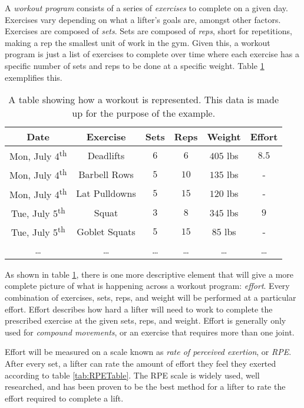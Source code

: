 A \textit{workout program} consists of a series of \textit{exercises} to complete on a given day. Exercises vary depending on what a lifter's goals are, amongst other factors. Exercises are composed of \textit{sets}. Sets are composed of \textit{reps}, short for repetitions, making a rep the smallest unit of work in the gym. Given this, a workout program is just a list of exercises to complete over time where each exercise has a specific number of sets and reps to be done at a specific weight. Table \ref{tab:WorkoutProgramExample} exemplifies this.

\begin{table}[h]
    \centering
    \begin{tabular}{c|c|c|c|c|c}
        Date & Exercise & Sets & Reps & Weight & Effort \\
        \hline
        Mon, July 4\textsuperscript{th} & Deadlifts & $6$ & $6$ & $405$ lbs & $8.5$ \\
        Mon, July 4\textsuperscript{th} & Barbell Rows & $5$ & $10$ & $135$ lbs & - \\
        Mon, July 4\textsuperscript{th} & Lat Pulldowns & $5$ & $15$ & $120$ lbs & - \\
        Tue, July 5\textsuperscript{th} & Squat & $3$ & $8$ & $345$ lbs & $9$ \\
        Tue, July 5\textsuperscript{th} & Goblet Squats & $5$ & $15$ & $85$ lbs & - \\
        \dots & \dots & \dots & \dots & \dots & \dots \\
    \end{tabular}
    \caption{A table showing how a workout is represented. This data is made up for the purpose of the example.}
    \label{tab:WorkoutProgramExample}
\end{table}

As shown in table \ref{tab:WorkoutProgramExample}, there is one more descriptive element that will give a more complete picture of what is happening across a workout program: \textit{effort}. Every combination of exercises, sets, reps, and weight will be performed at a particular effort. Effort describes how hard a lifter will need to work to complete the prescribed exercise at the given sets, reps, and weight. Effort is generally only used for \textit{compound movements}, or an exercise that requires more than one joint.

Effort will be measured on a scale known as \textit{rate of perceived exertion}, or \textit{RPE}. After every set, a lifter can rate the amount of effort they feel they exerted according to table \ref{tab:RPETable}. The RPE scale is widely used, well researched, and has been proven to be the best method for a lifter to rate the effort required to complete a lift. \cite{RPE_ACCURACY}

